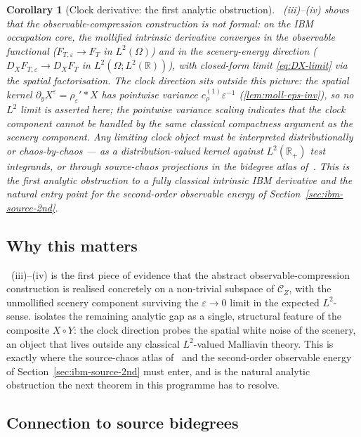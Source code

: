 \documentclass[11pt,reqno]{amsart}
\theoremstyle{plain}
\newtheorem{corollary}[theorem]{Corollary}
\theoremstyle{definition}
\theoremstyle{remark}
\newcommand{\R}{\mathbb{R}}
\newcommand{\IBM}{Z}
\begin{document}
\begin{corollary}[Clock derivative: the first analytic obstruction]
\label{cor:unmollified}
~(iii)--(iv) shows that the
observable-compression construction is not formal: on the IBM
occupation core, the mollified intrinsic derivative converges in the
observable functional ($F_{T,\varepsilon}\to F_T$ in $L^{2}(\Omega)$)
and in the scenery-energy direction ($D_X F_{T,\varepsilon}\to D_X F_T$
in $L^{2}(\Omega;L^{2}(\R))$), with closed-form limit
\eqref{eq:DX-limit} via the spatial factorisation. The clock direction
sits outside this picture: the spatial kernel
$\partial_yX^\varepsilon=\rho_\varepsilon'*X$ has pointwise variance
$c_\rho^{(1)}\varepsilon^{-1}$ (\cref{lem:moll-eps-inv}), so no $L^{2}$
limit is asserted here; the pointwise variance scaling indicates that
the clock component cannot be handled by the same classical
compactness argument as the scenery component. Any limiting clock
object must be interpreted distributionally or chaos-by-chaos --- as a
distribution-valued kernel against $L^{2}(\R_{+})$ test integrands, or
through source-chaos projections in the bidegree atlas
of~\cite{Fontes-IBMchaos,NualartVives}. This is the first analytic
obstruction to a fully classical intrinsic IBM derivative and the
natural entry point for the second-order observable energy of
Section~\ref{sec:ibm-source-2nd}.
\end{corollary}

\subsection*{Why this matters}

~(iii)--(iv) is the first piece of evidence that the
abstract observable-compression construction is realised concretely on
a non-trivial subspace of $\mathcal C_\IBM$, with the unmollified
scenery component surviving the $\varepsilon\to 0$ limit in the
expected $L^{2}$-sense.  isolates the remaining
analytic gap as a single, structural feature of the composite
$X\circ Y$: the clock direction probes the spatial white noise of the
scenery, an object that lives outside any classical $L^{2}$-valued
Malliavin theory. This is exactly where the source-chaos atlas
of~\cite{Fontes-IBMchaos} and the second-order observable energy of
Section~\ref{sec:ibm-source-2nd} must enter, and is the natural
analytic obstruction the next theorem in this programme has to
resolve.

\subsection*{Connection to source bidegrees}
\end{document}
